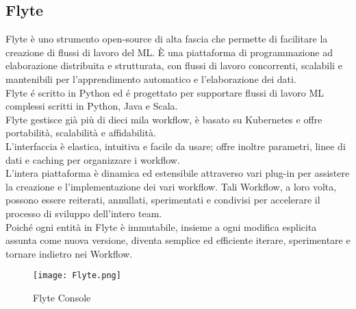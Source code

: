 \documentclass[../tesi.tex]{subfiles}
\begin{document}
\subsection{Flyte}
  Flyte è uno strumento open-source di alta fascia che permette di facilitare la creazione di flussi di lavoro del ML. È una piattaforma di programmazione ad elaborazione distribuita e strutturata, con flussi di lavoro concorrenti, scalabili e mantenibili per l’apprendimento automatico e l’elaborazione dei dati.\\
  Flyte é scritto in Python ed é progettato per supportare flussi di lavoro ML complessi scritti in Python, Java e Scala.\\
  Flyte gestisce già più di dieci mila workflow, è basato su \Gls{Kubernetes} e offre portabilità, scalabilità e affidabilità.\\
  L’interfaccia è elastica, intuitiva e facile da usare; offre inoltre parametri, linee di dati e caching per organizzare i workflow.\\
  L’intera piattaforma è dinamica ed estensibile attraverso vari plug-in per assistere la creazione e l’implementazione dei vari workflow. Tali Workflow, a loro volta, possono essere reiterati, annullati, sperimentati e condivisi per accelerare il processo di sviluppo dell’intero team.\\
  Poiché ogni entità in Flyte è immutabile, insieme a ogni modifica esplicita assunta come nuova versione, diventa semplice ed efficiente iterare, sperimentare e tornare indietro nei Workflow.\cite{flyteframework}
\begin{figure}[htbp]
  \centering
  \texttt{[image: Flyte.png]} 
  \caption{Flyte Console}
  \end{figure}

\newpage
\end{document}
